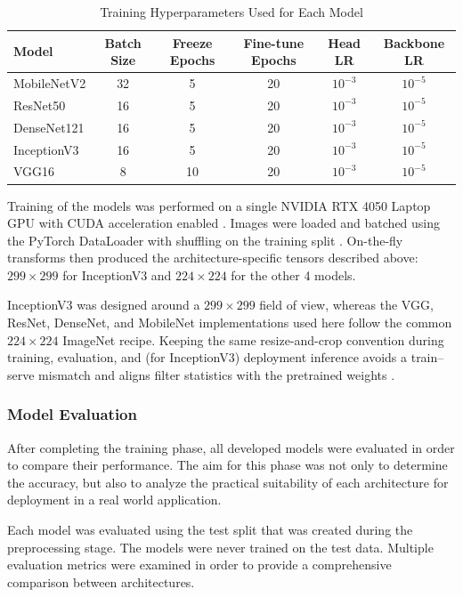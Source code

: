 \begin{table}[H]
\centering
\caption{Training Hyperparameters Used for Each Model}
\label{tab:training_hyperparameters}
\begin{tabular}{lccccc}
\hline
Model & Batch Size & Freeze Epochs & Fine-tune Epochs & Head LR & Backbone LR \\
\hline
MobileNetV2 & 32 & 5 & 20 & $10^{-3}$ & $10^{-5}$ \\
ResNet50 & 16 & 5 & 20 & $10^{-3}$ & $10^{-5}$ \\
DenseNet121 & 16 & 5 & 20 & $10^{-3}$ & $10^{-5}$ \\
InceptionV3 & 16 & 5 & 20 & $10^{-3}$ & $10^{-5}$ \\
VGG16 & 8 & 10 & 20 & $10^{-3}$ & $10^{-5}$ \\
\hline
\end{tabular}
\end{table}

Training of the models was performed on a single NVIDIA RTX 4050 Laptop GPU with CUDA 
acceleration enabled \cite{nvidiacuda2025}.
Images were loaded and batched using the PyTorch DataLoader with shuffling on 
the training split \cite{paszke2019pytorch}. On-the-fly transforms then produced the 
architecture-specific tensors described above: \textbf{$299\times 299$} for InceptionV3 
and \textbf{$224\times 224$} for the other 4 models.
 
InceptionV3 was designed around a $299\times 299$ field of view, whereas the VGG, ResNet, 
DenseNet, and MobileNet implementations used here follow the common $224\times 224$ 
ImageNet recipe. Keeping the same resize-and-crop convention during training, evaluation, 
and (for InceptionV3) deployment inference avoids a train--serve mismatch and aligns filter 
statistics with the pretrained weights \cite{paszke2019pytorch}.

\subsubsection{Model Evaluation}

After completing the training phase, all developed models were evaluated in
order to compare their performance. The aim for this phase was not only to 
determine the accuracy, but also to analyze the practical suitability of each 
architecture for deployment in a real world application.

Each model was evaluated using the test split that was created during the preprocessing stage. 
The models were never trained on the test data. Multiple evaluation metrics were examined in order
to provide a comprehensive comparison between architectures.

